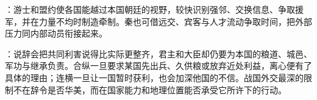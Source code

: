 \begin{turningpoint}
：游士和盟约使各国能越过本国朝廷的视野，较快识别强邻、交换信息、争取援军，并在力量不均时制造牵制。秦也可借远交、宾客与人才流动争取时间，把外部压力同内部动员衔接起来。

：说辞会把共同利害说得比实际更整齐，君主和大臣却仍要为本国的粮道、城邑、军功与继承负责。合纵一旦要求某国先出兵、久供粮或放弃近处利益，离心便有了具体的理由；连横一旦让一国暂时获利，也会加深他国的不信。战国外交最深的限制不在辞令是否华美，而在国家能力和地理位置能否承受它所许下的行动。
\end{turningpoint}

